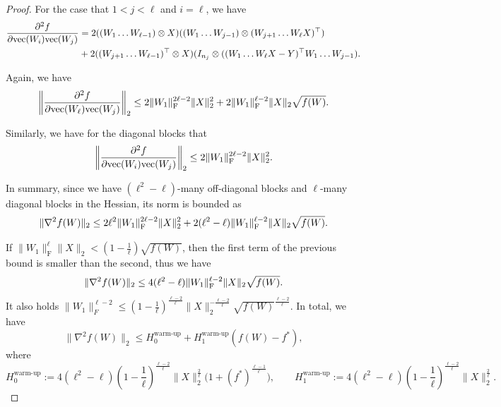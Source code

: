 \documentclass[a4paper,11pt]{article}
\newcommand{\1}{\mathbbm{1}}
\theoremstyle{plain}
\begin{document}
\begin{proof}
For the case that $1<j<\ell$ and $i = \ell$, we have 
\begin{align*}
    \frac{\partial^2 f}{\partial \textnormal{vec}(W_i) \textnormal{vec}(W_j)} &= 2 ((W_1 \dots W_{\ell-1}) \otimes X) ((W_1 \dots W_{j-1}) \otimes (W_{j+1} \dots W_{\ell} X)^\top) \\ & + 2 ((W_{j+1} \dots W_{\ell-1})^\top \otimes X) (I_{n_j} \otimes ((W_1 \dots W_{\ell} X-Y)^\top W_1 \dots W_{j-1} ).
\end{align*}

Again, we have
\begin{equation*}
    \left \|\frac{\partial^2 f}{\partial \textnormal{vec}(W_{\ell}) \textnormal{vec}(W_j)} \right\|_2 \leq 2 \|W_1\|_{\rm F}^{2 \ell-2} \|X\|^2_2 + 2 \|W_1\|_{\rm F}^{\ell-2} \|X\|_2 \sqrt{f(W)}.
\end{equation*}

    

Similarly, we have for the diagonal blocks that
\begin{equation*}
    \left \|\frac{\partial^2 f}{\partial \textnormal{vec}(W_i) \textnormal{vec}(W_j)} \right\|_2 \leq 2 \|W_1\|_{\rm F}^{2 \ell-2} \|X\|^2_2.
\end{equation*}




In summary, since we have $(\ell^2-\ell)$-many off-diagonal blocks and $\ell$-many diagonal blocks in the Hessian, its norm is bounded as
\begin{equation}
\label{eq:Hessian_bound_deepLN}
    \|\nabla^2 f(W) \|_2 \leq 2 \ell^2 \|W_1\|_{\rm F}^{2 \ell-2} \|X\|^2_2 + 2 (\ell^2-\ell) \|W_1\|_{\rm F}^{\ell-2} \|X\|_2 \sqrt{f(W)}.
\end{equation}

If $\|W_1\|_{\mathrm F}^\ell \|X\|_2 < (1-\frac{1}{\ell}) \sqrt{f(W)}$, then the first term of the previous bound is smaller than the second, thus we have
\begin{equation*}
\|\nabla^2 f(W) \|_2 \leq 4 (\ell^2-\ell) \|W_1\|_{\rm F}^{\ell-2} \|X\|_2 \sqrt{f(W)}.
\end{equation*}
It also holds $\|W_1\|_F^{\ell-2} \leq (1-\frac{1}{\ell})^{\frac{\ell-2}{\ell}} \|X\|_2^{-\frac{\ell-2}{\ell}} \sqrt{f(W)}^{\frac{\ell-2}{\ell}}$. In total, we have
\begin{equation*}
\label{eq:warmup-linear}
\|\nabla^2 f(W)\|_2 \le H_0^{\text{warm-up}}+H_1^{\text{warm-up}}(f(W)-f^*),
\end{equation*}
where 
\begin{equation}
\label{eq:warmup_constants_linear_network}
H_0^{\text{warm-up}}:=4(\ell^2-\ell) \left(1-\frac{1}{\ell}\right)^{\frac{\ell-2}{\ell}} \|X\|_2^{\frac{2}{\ell}}\bigl(1+(f^*)^{\frac{\ell-1}{\ell}}\bigr), \qquad H_1^{\text{warm-up}}:= 4 (\ell^2-\ell) \left(1-\frac{1}{\ell}\right)^{\frac{\ell-2}{\ell}} \|X\|_2^{\frac{2}{\ell}}.
\end{equation}


\end{proof}
\end{document}

